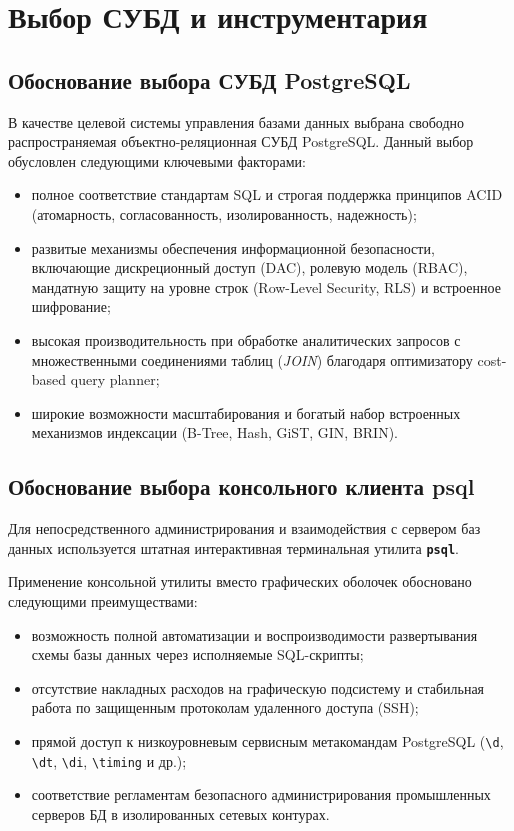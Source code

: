 \documentclass[a4paper,14pt]{article}
\begin{document}
\newpage
\section{Выбор СУБД и инструментария}

\subsection{Обоснование выбора СУБД PostgreSQL}
В качестве целевой системы управления базами данных выбрана свободно распространяемая объектно-реляционная СУБД PostgreSQL. Данный выбор обусловлен следующими ключевыми факторами:
\begin{itemize}
    \item полное соответствие стандартам SQL и строгая поддержка принципов ACID (атомарность, согласованность, изолированность, надежность);
    \item развитые механизмы обеспечения информационной безопасности, включающие дискреционный доступ (DAC), ролевую модель (RBAC), мандатную защиту на уровне строк (Row-Level Security, RLS) и встроенное шифрование;
    \item высокая производительность при обработке аналитических запросов с множественными соединениями таблиц (\textit{JOIN}) благодаря оптимизатору cost-based query planner;
    \item широкие возможности масштабирования и богатый набор встроенных механизмов индексации (B-Tree, Hash, GiST, GIN, BRIN).
\end{itemize}

\subsection{Обоснование выбора консольного клиента psql}
Для непосредственного администрирования и взаимодействия с сервером баз данных используется штатная интерактивная терминальная утилита \textbf{\texttt{psql}}.

Применение консольной утилиты вместо графических оболочек обосновано следующими преимуществами:
\begin{itemize}
    \item возможность полной автоматизации и воспроизводимости развертывания схемы базы данных через исполняемые SQL-скрипты;
    \item отсутствие накладных расходов на графическую подсистему и стабильная работа по защищенным протоколам удаленного доступа (SSH);
    \item прямой доступ к низкоуровневым сервисным метакомандам PostgreSQL (\texttt{\textbackslash d}, \texttt{\textbackslash dt}, \texttt{\textbackslash di}, \texttt{\textbackslash timing} и др.);
    \item соответствие регламентам безопасного администрирования промышленных серверов БД в изолированных сетевых контурах.
\end{itemize}
\end{document}
